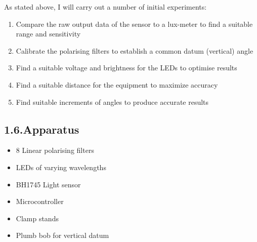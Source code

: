 \documentclass{article}
\begin{document}
\noindent{}As stated above, I will carry out a number of initial experiments:%

\begin{enumerate}%

\item{}
Compare the raw output data of the sensor to a lux-meter to find a suitable range and sensitivity%

\item{}
Calibrate the polarising filters to establish a common datum (vertical) angle%

\item{}
Find a suitable voltage and brightness for the LEDs to optimise results%

\item{}
Find a suitable distance for the equipment to maximize accuracy%

\item{}
Find suitable increments of angles to produce accurate results%
\end{enumerate}%

\subsection{1.6.\hspace*{0.5em}Apparatus}\label{sec-apparatus}%

\begin{itemize}[noitemsep,topsep=\mdcompacttopsep]%

\item{}8 Linear polarising filters%

\item{}LEDs of varying wavelengths%

\item{}BH1745 Light sensor%

\item{}Microcontroller%

\item{}Clamp stands%

\item{}Plumb bob for vertical datum%
\end{itemize}%
\end{document}
